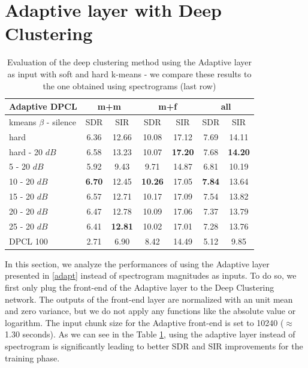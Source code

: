 \documentclass[master, tikz, final,11pt, dvipdfmx]{iscs-thesis}
\begin{document}
\section{Adaptive layer with Deep Clustering}
\label{DPCLADAPT}


\begin{table}[h!]
\centering
\begin{tabular}{l|c|c|c|c|c|c}
Adaptive DPCL & \multicolumn{2}{c|}{m+m} & \multicolumn{2}{c|}{m+f} & \multicolumn{2}{c}{all} \\ 
\hline 
kmeans $\beta$ - silence & SDR & SIR & SDR & SIR & SDR & SIR \\ 
\hline 
hard & 6.36 & 12.66 & 10.08 & 17.12 & 7.69 & 14.11 \\ 
hard - 20 $dB$ & 6.58 & 13.23 & 10.07 & \textbf{17.20} & 7.68 & \textbf{14.20} \\ 
\hline 
\hline 
5 - 20 $dB$ & 5.92 & 9.43 & 9.71 & 14.87 & 6.81 & 10.19 \\ 
10 - 20 $dB$ & \textbf{6.70} & 12.45 & \textbf{10.26} & 17.05 & \textbf{7.84} & 13.64 \\ 
15 - 20 $dB$ & 6.57 & 12.71 & 10.17 & 17.09 & 7.54 & 13.82 \\ 
20 - 20 $dB$ & 6.47 & 12.78 & 10.09 & 17.06 & 7.37 & 13.79 \\ 
25 - 20 $dB$ & 6.41 & \textbf{12.81} & 10.02 & 17.01 & 7.28 & 13.76 \\ 
\hline 
\hline 
DPCL 100 & 2.71 & 6.90 & 8.42 & 14.49 & 5.12 & 9.85 \\ 
\end{tabular}
\captionsetup{justification=centering}
\caption{Evaluation of the deep clustering method using the Adaptive layer as input with soft and hard k-means - we compare these results to the one obtained using spectrograms  (last row)}
\label{table:AdaptDPCL100}
\end{table}


In this section, we analyze the performances of using the Adaptive layer presented in \autoref{adapt} instead of spectrogram magnitudes as inputs.
To do so, we first only plug the front-end of the Adaptive layer to the Deep Clustering network. The outputs of the front-end layer are normalized with an unit mean and zero variance, 
but we do not apply any functions like the absolute value or logarithm.
The input chunk size for the Adaptive front-end is set to 10240 ($\approx$ 1.30 seconds). 
As we can see in the Table \ref{table:AdaptDPCL100}, using the adaptive layer instead of spectrogram is significantly leading to better SDR and SIR improvements for the training phase.
\end{document}
